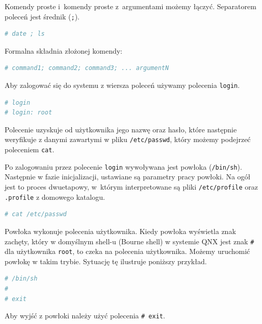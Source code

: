 \documentclass[11pt,twoside,a4paper]{article}
\begin{document}
\begin{example}\label{ex:prostakomenda3} 

Komendy proste i~komendy proste z~argumentami możemy łączyć. Separatorem poleceń jest średnik (\lstinline{;}). 


\begin{lstlisting}[language=bash]
# date ; ls
\end{lstlisting}

Formalna składnia złożonej komendy: 

\begin{lstlisting}[language=bash]
# command1; command2; command3; ... argumentN
\end{lstlisting}
\end{example}

\begin{example}\label{ex:prostakomenda4} 


Aby zalogować się do systemu z wiersza poleceń używamy polecenia \lstinline{login}.

\begin{lstlisting}[language=bash]
# login
# login: root
\end{lstlisting}

Polecenie uzyskuje od użytkownika jego nazwę oraz hasło, które następnie weryfikuje z danymi zawartymi w pliku \lstinline{/etc/passwd}, który możemy podejrzeć poleceniem \lstinline{cat}. 
\end{example}


\begin{example}\label{ex:prostakomenda5} 


Po zalogowaniu przez polecenie \lstinline{login} wywoływana jest powłoka (\lstinline{/bin/sh}). Następnie w fazie inicjalizacji, ustawiane są parametry pracy powłoki. Na ogół jest to proces dwuetapowy, w~którym interpretowane są pliki \lstinline{/etc/profile} oraz \lstinline{.profile} z domowego katalogu. 

\begin{lstlisting}[language=bash]
# cat /etc/passwd
\end{lstlisting}
\end{example}

\begin{example}\label{ex:prostakomenda6} 


Powłoka wykonuje polecenia użytkownika. Kiedy powłoka wyświetla znak zachęty, który w domyślnym shell-u (Bourne shell) w systemie QNX jest znak \lstinline{#} dla użytkownika \lstinline{root}, to czeka na polecenia użytkownika. Możemy uruchomić powłokę w takim trybie. Sytuację tę ilustruje poniższy przykład.  


\begin{lstlisting}[language=bash]
# /bin/sh
#
# exit
\end{lstlisting}

Aby wyjść z powłoki należy użyć polecenia \lstinline{# exit}. 
\end{example}
\end{document}
